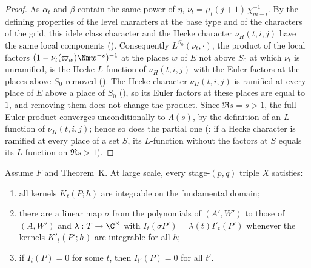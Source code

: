 \begin{proof}
As $\alpha_t$ and $\beta$ contain the same power of $\eta$, $\nu_t=\mu_t(j+1)\,\chi_{m-i}^{-1}$. By the defining properties of the
level characters at the base type and of the characters of the grid, this idele class character and the Hecke character
$\nu_H(t,i,j)$ have the same local components (). Consequently $L^{S_0}(\nu_t,\cdot)$, the product of the local factors
$(1-\nu_t(\varpi_w)\Nm w^{-s})^{-1}$ at the places $w$ of $E$ not above $S_0$ at which $\nu_t$ is unramified, is the Hecke
$L$-function of $\nu_H(t,i,j)$ with the Euler factors at the places above $S_0$ removed
(). The Hecke character $\nu_H(t,i,j)$ is ramified at every place of $E$ above a
place of $S_0$ (), so its Euler factors at these places are equal to $1$, and
removing them does not change the product. Since $\Re s=s>1$, the full Euler product converges unconditionally to $\Lambda(s)$,
by the definition of an $L$-function of $\nu_H(t,i,j)$; hence so does the partial one
(: if a Hecke character is ramified at every place of a set $S$, its
$L$-function without the factors at $S$ equals its $L$-function on $\Re s>1$).
\end{proof}

\begin{lemma}\label{pf:sh-theta:stageint}
Assume $F$ and Theorem~K. At large scale, every stage-$(p,q)$ triple $X$ satisfies:
\begin{enumerate}[label=(\alph*)]
\item all kernels $K_t(P;h)$ are integrable on the fundamental domain;
\item there are a linear map $\sigma$ from the polynomials of $(A',W')$ to those of $(A,W')$ and $\lambda:T\to\C^\times$ with
$I_t(\sigma P')=\lambda(t)I'_t(P')$ whenever the kernels $K'_t(P';h)$ are integrable for all $h$;
\item if $I_t(P)=0$ for some $t$, then $I_{t'}(P)=0$ for all $t'$.
\end{enumerate}
\end{lemma}

